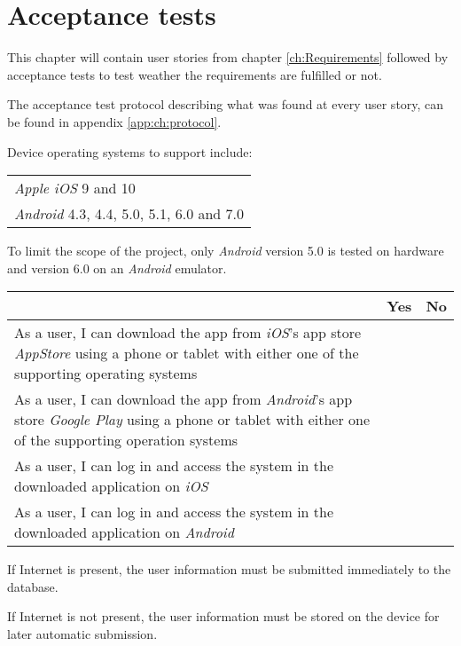 \chapter{Acceptance tests}
This chapter will contain user stories from chapter \ref{ch:Requirements} followed by acceptance tests to test weather the requirements are fulfilled or not.

The acceptance test protocol describing what was found at every user story, can be found in appendix \ref{app:ch:protocol}.


Device operating systems to support include: \newline
\begin{tabularx}{\textwidth}{X}
    \textit{Apple iOS} 9 and 10 \\
    \textit{Android} 4.3, 4.4, 5.0, 5.1, 6.0 and 7.0
\end{tabularx}

To limit the scope of the project, only \textit{Android} version 5.0 is tested on hardware and version 6.0 on an \textit{Android} emulator.

\begin{tabularx}{\textwidth}{|b|c|c|}
	\hline
	 & Yes & No \\
	\hline
	As a user, I can download the app from \textit{iOS}'s app store \textit{AppStore} using a phone or tablet with either one of the supporting operating systems &   & \xmark  \\
	\hline
	As a user, I can download the app from \textit{Android}'s app store \textit{Google Play} using a phone or tablet with either one of the supporting operation systems & \xmark  &  \\
	\hline
	As a user, I can log in and access the system in the downloaded application on \textit{iOS} &  & \xmark \\
		\hline
	As a user, I can log in and access the system in the downloaded application on \textit{Android} & \xmark  &  \\
	\hline
\end{tabularx}


If Internet is present, the user information must be submitted immediately to the database.

If Internet is not present, the user information must be stored on the device for later automatic submission.

